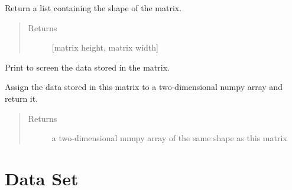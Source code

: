 \documentclass[letterpaper,10pt,english]{sphinxmanual}
\begin{document}
\begin{fulllineitems}

\begin{fulllineitems}
\label{\detokenize{index:dbm_py.interface.Matrix.shape}}
Return a list containing the shape of the matrix.
\begin{quote}\begin{description}
\item[{Returns}] \leavevmode
{[}matrix height, matrix width{]}

\end{description}\end{quote}

\end{fulllineitems}


\begin{fulllineitems}
\label{\detokenize{index:dbm_py.interface.Matrix.show}}
Print to screen the data stored in the matrix.

\end{fulllineitems}


\begin{fulllineitems}
\label{\detokenize{index:dbm_py.interface.Matrix.to_np2darray}}
Assign the data stored in this matrix to a two-dimensional numpy array and return it.
\begin{quote}\begin{description}
\item[{Returns}] \leavevmode
a two-dimensional numpy array of the same shape as this matrix

\end{description}\end{quote}

\end{fulllineitems}


\end{fulllineitems}



\section{Data Set}
\label{\detokenize{index:data-set}}
\end{document}
